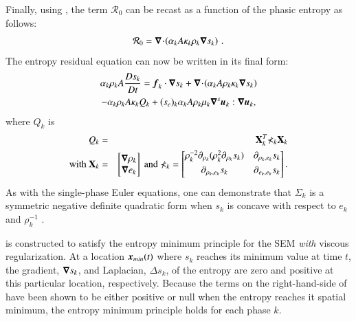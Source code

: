 \documentclass[preprint,10pt]{elsarticle}
\begin{document}
Finally, using , the term $\mathcal{R}_0$ can be recast as a function of the phasic entropy as follows: 
%
\begin{equation}
\mathcal{R}_0 = \boldsymbol\nabla\! \cdot \! \left( \alpha_k A \kappa_k \rho_k \boldsymbol\nabla s_k \right) \,.
\end{equation}
%
The entropy residual equation can now be written in its final form:
%
\begin{multline}\label{eq:ent-res-7-eqn-diss-terms3}
\alpha_k \rho_k A \frac{Ds_k}{Dt} =  \boldsymbol f_k \cdot \boldsymbol\nabla s_k + \boldsymbol\nabla\! \cdot \! \left( \alpha_k A \rho_k \kappa_k  \boldsymbol\nabla s_k \right)  \\
- \alpha_k \rho_k A \kappa_k Q_k + (s_e)_k \alpha_k A \rho_k \mu_k \boldsymbol\nabla^s \boldsymbol u_k : \boldsymbol\nabla \boldsymbol u_k,
\end{multline}
%
where $Q_k$ is 
%
\begin{eqnarray}
Q_k &=& \mathbf{X}^T_k \mathbb{\Sigma}_k \mathbf{X}_k \nonumber \\
\text{with } \mathbf{X}_k &=& \begin{bmatrix}
\boldsymbol\nabla \rho_k \\
\boldsymbol\nabla e_k 
\end{bmatrix}
\text{ and } \mathbb{\Sigma}_k = \begin{bmatrix}
       \rho_k^{-2} \partial_{\rho_k} (\rho^2_k \partial_{\rho_k} s_k) & \partial_{\rho_k,e_k} s_k  \\[0.3em]
       \partial_{\rho_k,e_k} s_k & \partial_{e_k,e_k} s_k           \\[0.3em]
     \end{bmatrix}. \nonumber 
\end{eqnarray}
%
As with the single-phase Euler equations, one can demonstrate that $\mathbb{\Sigma}_k$ is a symmetric negative definite quadratic form 
when $s_k$ is concave with respect to $e_k$ and $\rho_k^{-1}$  \cite{jlg, Marco_paper_low_mach}.

 is constructed to satisfy the entropy minimum principle for the SEM \emph{with} viscous regularization. 
At a location $\boldsymbol x_{min}(t)$ where $s_k$ reaches its minimum value at time $t$, the gradient, $\boldsymbol\nabla s_k$, and Laplacian, $\Delta s_k$, 
of the entropy are zero and positive at this particular location, respectively. %
Because the terms on the right-hand-side of  have been shown to be either positive or null when 
the entropy reaches it spatial minimum, the entropy minimum principle holds for each phase $k$.
%
%
\end{document}
